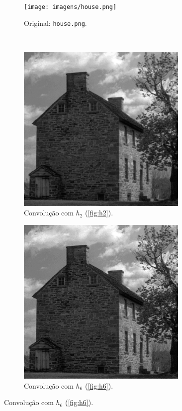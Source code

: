 \begin{figure}[H]
    \centering
    \begin{subfigure}{0.48\textwidth}
        \centering
        \texttt{[image: imagens/house.png]}
        \caption{Original: \texttt{house.png}.}
        \label{fig:blur:orig}
    \end{subfigure}\\[8pt]
    \begin{subfigure}{0.48\textwidth}
        \centering
        \includegraphics[width=0.9\textwidth]{resultados/house_h2.png}
        \caption{Convolução com $h_2$ (\ref{fig:h2}).}
        \label{fig:blur:gauss}
    \end{subfigure}%
    \begin{subfigure}{0.48\textwidth}
        \centering
        \includegraphics[width=0.9\textwidth]{resultados/house_h6.png}
        \caption{Convolução com $h_6$ (\ref{fig:h6}).}
        \label{fig:blur:box}
    \end{subfigure}


\end{figure}
